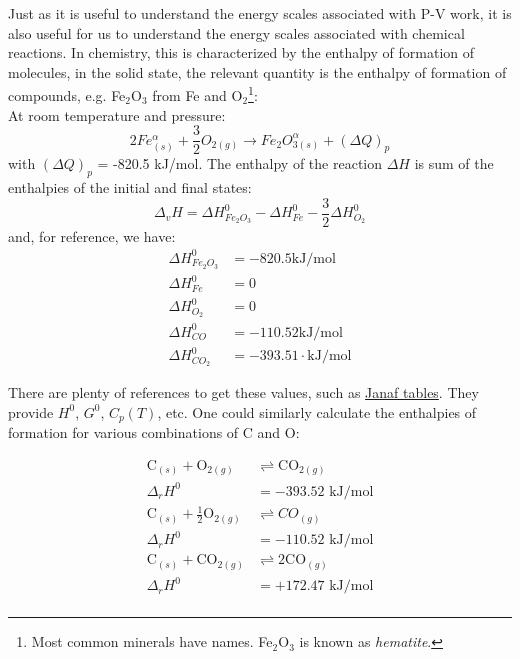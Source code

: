 \documentclass[12pt]{article}
\begin{document}
Just as it is useful to understand the energy scales associated with P-V work, it is also useful for us to understand the energy scales associated with chemical reactions. In chemistry, this is characterized by the enthalpy of formation of molecules, in the solid state, the relevant quantity is the enthalpy of formation of compounds, e.g. Fe$_2$O$_3$ from Fe and O$_2$\footnote{ Most common minerals have names. Fe$_2$O$_3$ is known as \textit{hematite}.}:\\

At room temperature and pressure:
\begin{equation}
2 Fe_{(s)}^{\alpha} + \frac{3}{2}O_{2 (g)} \rightarrow Fe_2O_{3 (s)}^{\alpha} + (\Delta Q)_p
\end{equation}
with $(\Delta Q)_p$ = -820.5 kJ/mol.  The enthalpy of the reaction $\Delta H$ is sum of the enthalpies of the initial and final states:
\begin{equation}
\Delta_v H = \Delta H^0_{Fe_2O_3} - \Delta H^0_{Fe} - \frac{3}{2} \Delta H^0_{O_2}
\end{equation}
and, for reference, we have:
\begin{align*}
\Delta H^0_{Fe_2O_3} &= -820.5 \text{kJ}/\text{mol}\\
\Delta H^0_{Fe} &= 0\\
\Delta H^0_{O_2} &= 0\\
\Delta H^0_{CO} &= -110.52 \text{kJ}/\text{mol}\\
\Delta H^0_{CO_2} &= -393.51 \cdot \text{kJ}/\text{mol}
\end{align*}

There are plenty of references to get these values, such as \href{http://kinetics.nist.gov/janaf/}{Janaf tables}. They provide $H^0$, $G^0$, $C_p (T)$, etc. One could similarly calculate the enthalpies of formation for various combinations of C and O:

\begin{align*}
\text{C}_{(s)} + \text{O}_{2 (g)} &\rightleftharpoons \text{CO}_{2 (g)}\\
\Delta_r H^0 &= -393.52 \text{ kJ}/\text{mol}\\
\text{C}_{(s)} + \frac{1}{2} \text{O}_{2 (g)} &\rightleftharpoons CO_{(g)}\\
\Delta_r H^0 &= -110.52 \text{ kJ}/\text{mol}\\
\text{C}_{(s)} + \text{CO}_{2 (g)} &\rightleftharpoons 2 \text{CO}_{(g)}\\
\Delta_r H^0 &= +172.47 \text{ kJ}/\text{mol}\\
\end{align*}
\end{document}
